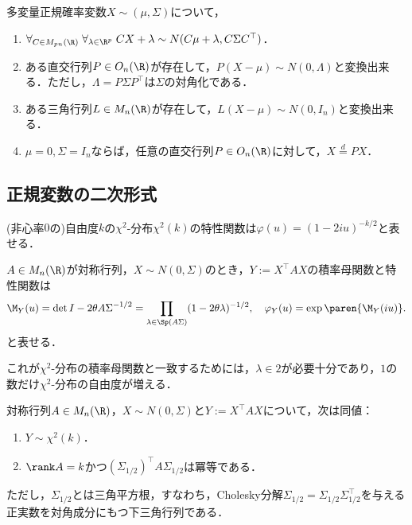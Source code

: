 \documentclass[uplatex, dvipdfmx]{jsreport}
\begin{document}
\begin{proposition}[多変量正規分布の変換]
    多変量正規確率変数$X\sim (\mu,\Sigma)$について，
    \begin{enumerate}
        \item $\forall_{C\in M_{pn}(\R)}\;\forall_{\lambda\in\R^p}\;CX+\lambda\sim N(C\mu+\lambda,C\Sigma C^\top)$．
        \item ある直交行列$P\in O_n(\R)$が存在して，$P(X-\mu)\sim N(0,\Lambda)$と変換出来る．ただし，$\Lambda=P\Sigma P^\top$は$\Sigma$の対角化である．
        \item ある三角行列$L\in M_n(\R)$が存在して，$L(X-\mu)\sim N(0,I_n)$と変換出来る．
        \item $\mu=0,\Sigma=I_n$ならば，任意の直交行列$P\in O_n(\R)$に対して，$X\overset{d}{=}PX$．
    \end{enumerate}
\end{proposition}

\subsection{正規変数の二次形式}

\begin{tcolorbox}[colframe=ForestGreen, colback=ForestGreen!10!white,breakable,colbacktitle=ForestGreen!40!white,coltitle=black,fonttitle=\bfseries\sffamily,
title=]
    (非心率$0$の)自由度$k$の$\chi^2$-分布$\chi^2(k)$の特性関数は$\varphi(u)=(1-2iu)^{-k/2}$と表せる．
\end{tcolorbox}

\begin{theorem}[正規確率変数の二次形式]
    $A\in M_n(\R)$が対称行列，$X\sim N(0,\Sigma)$のとき，$Y:=X^\top AX$の積率母関数と特性関数は
    \[\M_Y(u)=\det{I-2\theta A\Sigma}^{-1/2}=\prod_{\lambda\in\Sp(A\Sigma)}(1-2\theta\lambda)^{-1/2},\quad\varphi_Y(u)=\exp\paren{\M_Y(iu)}.\]
    と表せる．
\end{theorem}
\begin{remarks}
    これが$\chi^2$-分布の積率母関数と一致するためには，$\lambda\in2$が必要十分であり，$1$の数だけ$\chi^2$-分布の自由度が増える．
\end{remarks}

\begin{corollary}
    対称行列$A\in M_n(\R)$，$X\sim N(0,\Sigma)$と$Y:=X^\top AX$について，次は同値：
    \begin{enumerate}
        \item $Y\sim \chi^2(k)$．
        \item $\rank A=k$かつ$(\Sigma_{1/2})^\top A\Sigma_{1/2}$は冪等である．
    \end{enumerate}
    ただし，$\Sigma_{1/2}$とは三角平方根，すなわち，Cholesky分解$\Sigma_{1/2}=\Sigma_{1/2}\Sigma_{1/2}^\top$を与える正実数を対角成分にもつ下三角行列である．
\end{corollary}
\end{document}
